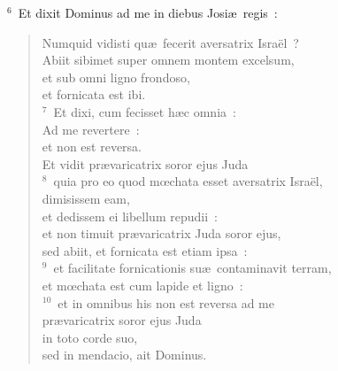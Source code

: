 ${}^{6}$~Et dixit Dominus ad me in diebus Josi\ae\ regis~: \begin{flushleft}\begin{verse}Numquid vidisti qu\ae\ fecerit aversatrix Isra\"el~?\\ Abiit sibimet super omnem montem excelsum,\\ et sub omni ligno frondoso,\\ et fornicata est ibi.\\
${}^{7}$~Et dixi, cum fecisset h\ae c omnia~:\\ Ad me revertere~:\\ et non est reversa.\\ Et vidit pr\ae varicatrix soror ejus Juda\\
${}^{8}$~quia pro eo quod mœchata esset aversatrix Isra\"el,\\ dimisissem eam,\\ et dedissem ei libellum repudii~:\\ et non timuit pr\ae varicatrix Juda soror ejus,\\ sed abiit, et fornicata est etiam ipsa~:\\
${}^{9}$~et facilitate fornicationis su\ae\ contaminavit terram,\\ et mœchata est cum lapide et ligno~:\\
${}^{10}$~et in omnibus his non est reversa ad me\\ pr\ae varicatrix soror ejus Juda\\ in toto corde suo,\\ sed in mendacio, ait Dominus.\end{verse}\end{flushleft}


